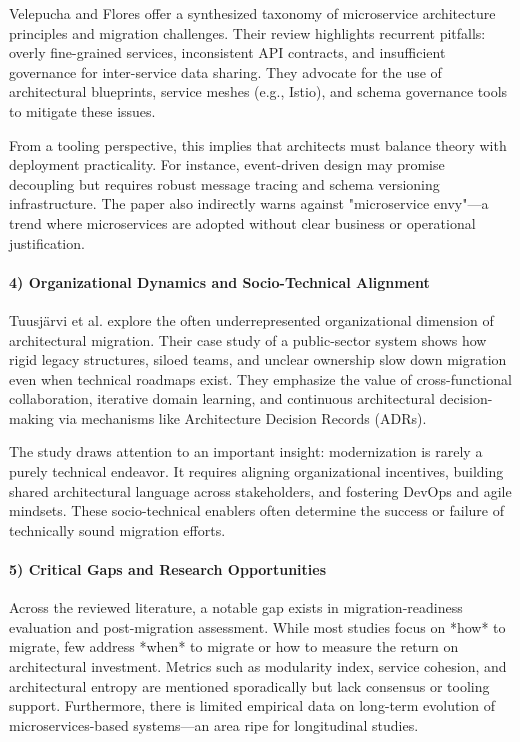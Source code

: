 \documentclass[12pt]{article}
\begin{document}
Velepucha and Flores \cite{velepucha2023} offer a synthesized taxonomy of microservice architecture principles and migration challenges. Their review highlights recurrent pitfalls: overly fine-grained services, inconsistent API contracts, and insufficient governance for inter-service data sharing. They advocate for the use of architectural blueprints, service meshes (e.g., Istio), and schema governance tools to mitigate these issues.

From a tooling perspective, this implies that architects must balance theory with deployment practicality. For instance, event-driven design may promise decoupling but requires robust message tracing and schema versioning infrastructure. The paper also indirectly warns against "microservice envy"—a trend where microservices are adopted without clear business or operational justification.

\paragraph{4) Organizational Dynamics and Socio-Technical Alignment}

Tuusjärvi et al. \cite{tuusjarvi2024} explore the often underrepresented organizational dimension of architectural migration. Their case study of a public-sector system shows how rigid legacy structures, siloed teams, and unclear ownership slow down migration even when technical roadmaps exist. They emphasize the value of cross-functional collaboration, iterative domain learning, and continuous architectural decision-making via mechanisms like Architecture Decision Records (ADRs).

The study draws attention to an important insight: modernization is rarely a purely technical endeavor. It requires aligning organizational incentives, building shared architectural language across stakeholders, and fostering DevOps and agile mindsets. These socio-technical enablers often determine the success or failure of technically sound migration efforts.

\paragraph{5) Critical Gaps and Research Opportunities}

Across the reviewed literature, a notable gap exists in migration-readiness evaluation and post-migration assessment. While most studies focus on *how* to migrate, few address *when* to migrate or how to measure the return on architectural investment. Metrics such as modularity index, service cohesion, and architectural entropy are mentioned sporadically but lack consensus or tooling support. Furthermore, there is limited empirical data on long-term evolution of microservices-based systems—an area ripe for longitudinal studies.
\end{document}

